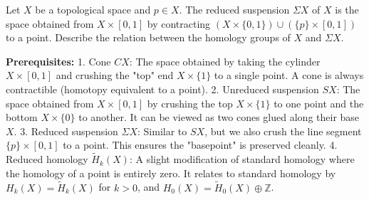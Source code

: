\begin{exercise}
\label{geometry:2016:8}
Let $X$ be a topological space and $p \in X$. The reduced suspension $\Sigma X$ of $X$ is the space obtained from $X \times [0, 1]$ by contracting $(X \times \{0, 1\}) \cup (\{p\} \times [0, 1])$ to a point. Describe the relation between the homology groups of $X$ and $\Sigma X$.
\end{exercise}

\begin{solution}
\textbf{Prerequisites:}
1. Cone $CX$: The space obtained by taking the cylinder $X \times [0, 1]$ and crushing the "top" end $X \times \{1\}$ to a single point. A cone is always contractible (homotopy equivalent to a point).
2. Unreduced suspension $SX$: The space obtained from $X \times [0, 1]$ by crushing the top $X \times \{1\}$ to one point and the bottom $X \times \{0\}$ to another. It can be viewed as two cones glued along their base $X$.
3. Reduced suspension $\Sigma X$: Similar to $SX$, but we also crush the line segment $\{p\} \times [0, 1]$ to a point. This ensures the "basepoint" is preserved cleanly.
4. Reduced homology $\tilde{H}_k(X)$: A slight modification of standard homology where the homology of a point is entirely zero. It relates to standard homology by $H_k(X) = \tilde{H}_k(X)$ for $k > 0$, and $H_0(X) = \tilde{H}_0(X) \oplus \mathbb{Z}$.\\[2ex]


\end{solution}
